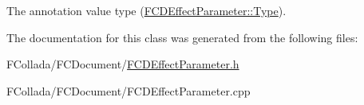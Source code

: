 \label{classFCDEffectParameterAnnotation_afd3d8cdacd96378545bbef52335e23da}
The annotation value type (\hyperlink{classFCDEffectParameter_a1efe74553d2ed199435085c171743b08}{FCDEffectParameter::Type}). 

The documentation for this class was generated from the following files:\begin{DoxyCompactItemize}
\item 
FCollada/FCDocument/\hyperlink{FCDEffectParameter_8h}{FCDEffectParameter.h}\item 
FCollada/FCDocument/FCDEffectParameter.cpp\end{DoxyCompactItemize}
